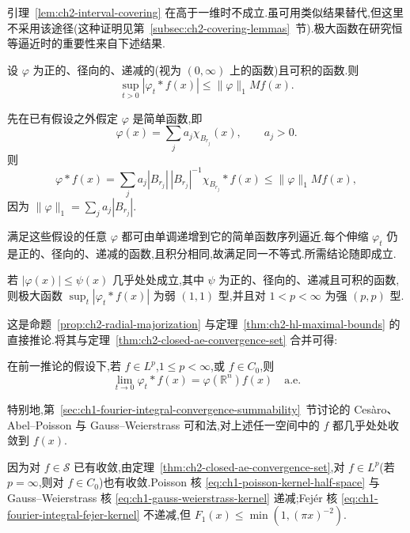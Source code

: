 引理~\ref{lem:ch2-interval-covering} 在高于一维时不成立.虽可用类似结果替代,但这里不采用该途径(这种证明见第~\ref{subsec:ch2-covering-lemmas}~节).极大函数在研究恒等逼近时的重要性来自下述结果.

\begin{Proposition}
\label{prop:ch2-radial-majorization}
设 $\varphi$ 为正的、径向的、递减的(视为 $(0,\infty)$ 上的函数)且可积的函数.则
\[
 \sup_{t>0}|\varphi_t*f(x)|\le\|\varphi\|_1Mf(x).
\]
\end{Proposition}

\hypertarget{sample-page-044}{}
\begin{Proof}
先在已有假设之外假定 $\varphi$ 是简单函数,即
\[
 \varphi(x)=\sum_ja_j\chi_{B_{r_j}}(x),\qquad a_j>0.
\]
则
\[
 \varphi*f(x)=\sum_ja_j|B_{r_j}|\,|B_{r_j}|^{-1}\chi_{B_{r_j}}*f(x)
 \le\|\varphi\|_1Mf(x),
\]
因为 $\|\varphi\|_1=\sum_ja_j|B_{r_j}|$.

满足这些假设的任意 $\varphi$ 都可由单调递增到它的简单函数序列逼近.每个伸缩 $\varphi_t$ 仍是正的、径向的、递减的函数,且积分相同,故满足同一不等式.所需结论随即成立.
\end{Proof}

\begin{Corollary}
\label{cor:ch2-kernel-maximal-bound}
若 $|\varphi(x)|\le\psi(x)$ 几乎处处成立,其中 $\psi$ 为正的、径向的、递减且可积的函数,则极大函数 $\sup_t|\varphi_t*f(x)|$ 为弱 $(1,1)$ 型,并且对 $1<p<\infty$ 为强 $(p,p)$ 型.
\end{Corollary}

这是命题~\ref{prop:ch2-radial-majorization} 与定理~\ref{thm:ch2-hl-maximal-bounds} 的直接推论.将其与定理~\ref{thm:ch2-closed-ae-convergence-set} 合并可得:

\begin{Corollary}
\label{cor:ch2-approximation-ae-convergence}
在前一推论的假设下,若 $f\in L^p$,$1\le p<\infty$,或 $f\in C_0$,则
\[
 \lim_{t\to0}\varphi_t*f(x)=\varphi(\mathbb R^n)f(x)\quad\text{a.e.}
\]
\end{Corollary}
特别地,第~\ref{sec:ch1-fourier-integral-convergence-summability}~节讨论的 Cesàro、Abel--Poisson 与 Gauss--Weierstrass 可和法,对上述任一空间中的 $f$ 都几乎处处收敛到 $f(x)$.

\begin{Proof}
因为对 $f\in\mathcal S$ 已有收敛,由定理~\ref{thm:ch2-closed-ae-convergence-set},对 $f\in L^p$(若 $p=\infty$,则对 $f\in C_0$)也有收敛.Poisson 核 \eqref{eq:ch1-poisson-kernel-half-space} 与 Gauss--Weierstrass 核 \eqref{eq:ch1-gauss-weierstrass-kernel} 递减;Fejér 核 \eqref{eq:ch1-fourier-integral-fejer-kernel} 不递减,但 $F_1(x)\le\min(1,(\pi x)^{-2})$.
\end{Proof}

